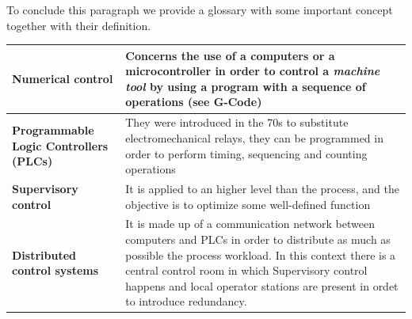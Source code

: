 To conclude this paragraph we provide a glossary with some important concept together with their definition.

\begin{table}[h]
    \centering
    \begin{tabular}{p{5cm} p{10cm}}
        \toprule
        \textbf{Numerical control}&{Concerns the use of a computers or a microcontroller in order to control a  \textit{machine tool} by using a program with a sequence of operations (see G-Code)}\\
        \midrule
        \textbf{Programmable Logic Controllers (PLCs)}&{They were introduced in the 70s to substitute electromechanical relays, they can be programmed in order to perform timing, sequencing and counting operations}\\
        \midrule
        \textbf{Supervisory control}&{It is applied to an higher level than the process, and the objective is to optimize some well-defined function}\\
        \midrule
        \textbf{Distributed control systems}&{It is made up of a communication network between computers and PLCs in order to distribute as much as possible the process workload}. In this context there is a central control room in which Supervisory control happens and local operator stations are present in ordet to introduce redundancy.\\
        \bottomrule
    \end{tabular}
\end{table}

